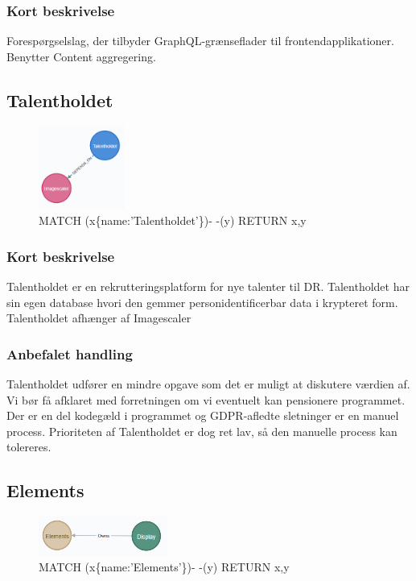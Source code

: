 \documentclass{article}
\begin{document}
\subsubsection{Kort beskrivelse}
Forespørgselslag, der tilbyder GraphQL-grænseflader til frontendapplikationer.
Benytter Content aggregering.



\subsection{Talentholdet}
\begin{figure}[h]
\includegraphics[width=80pt]{Talentholdet.PNG}
\caption{MATCH (x\{name:'Talentholdet'\})- -(y) RETURN x,y}
\end{figure}
\subsubsection{Kort beskrivelse}
Talentholdet er en rekrutteringsplatform for nye talenter til DR. Talentholdet har sin egen database hvori den gemmer personidentificerbar data i krypteret form. Talentholdet afhænger af Imagescaler
\subsubsection{Anbefalet handling}
Talentholdet udfører en mindre opgave som det er muligt at diskutere værdien af. Vi bør få afklaret med forretningen om vi eventuelt kan pensionere programmet. Der er en del kodegæld i programmet og GDPR-afledte sletninger er en manuel process.
Prioriteten af Talentholdet er dog ret lav, så den manuelle process kan tolereres.


\subsection{Elements}
\begin{figure}[h]
\includegraphics[width=120pt]{Elements.PNG}
\caption{MATCH (x\{name:'Elements'\})- -(y) RETURN x,y}
\end{figure}
\end{document}

